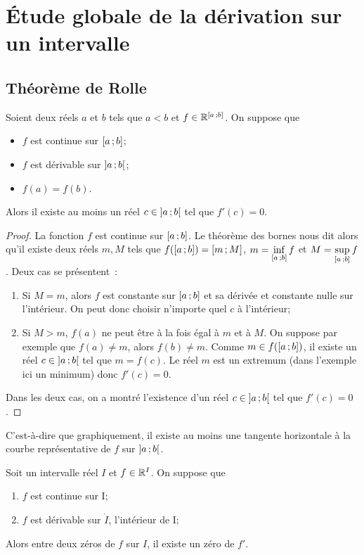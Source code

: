 \section{Étude globale de la dérivation sur un intervalle}

\subsection{Théorème de Rolle}

\begin{theo}
  Soient deux réels $a$ et $b$ tels que $a < b$ et $f \in \mathbb{R}^{\left[ a \, ;  b \right]}$. On suppose que
  \begin{itemize}
  \item $f$ est continue sur $\left[ a \, ;  b \right]$;
  \item $f$ est dérivable sur $\left] a \, ;  b \right[$;
  \item $f(a)=f(b)$.
  \end{itemize}
  Alors il existe au moins un réel $c \in \left] a \, ;  b \right[$ tel que $f'(c)=0$.
\end{theo}
\begin{proof}
  La fonction $f$ est continue sur $\left[ a \, ;  b \right]$. Le théorème des bornes nous dit alors qu'il existe deux réels $m,M$ tels que $f(\left[ a \, ;  b \right])=\left[ m \, ;  M \right]$, $m = \inf\limits_{\left[ a \, ;  b \right]} f$ et $M = \sup\limits_{\left[ a \, ;  b \right]} f$. Deux cas se présentent~:
  \begin{enumerate}
  \item Si $M=m$, alors $f$ est constante sur $\left[ a \, ;  b \right]$ et sa dérivée et constante nulle sur l'intérieur. On peut donc choisir n'importe quel $c$ à l'intérieur;
  \item Si $M > m$, $f(a)$ ne peut être à la fois égal à $m$ et à $M$. On suppose par exemple que $f(a) \neq m$, alors $f(b) \neq m$. Comme $m \in f(\left[ a \, ;  b \right])$, il existe un réel $c \in \left] a \, ;  b \right[$ tel que $m=f(c)$. Le réel $m$ est un extremum (dans l'exemple ici un minimum) donc $f'(c)=0$.
  \end{enumerate}
  Dans les deux cas, on a montré l'existence d'un réel $c \in \left] a \, ;  b \right[$ tel que $f'(c)=0$.
\end{proof}

C'est-à-dire que graphiquement, il existe au moins une tangente horizontale à la courbe représentative de $f$ sur $\left] a \, ;  b \right[$.

\begin{corth}
  Soit un intervalle réel $I$ et $f \in \mathbb{R}^I$. On suppose que
  \begin{enumerate}
  \item $f$ est continue sur I;
  \item $f$ est dérivable sur $\mathring{I}$, l'intérieur de I;
  \end{enumerate}
  Alors entre deux zéros de $f$ sur $I$, il existe un zéro de $f'$.
\end{corth}

